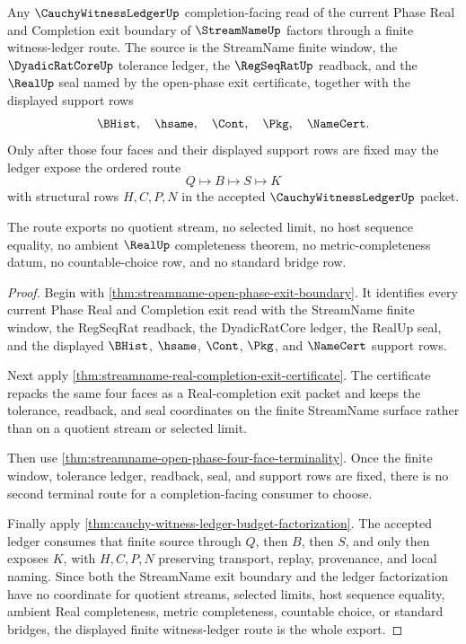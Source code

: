 \begin{theorem}
\label{thm:streamname-cauchy-witness-ledger-exit-route}
Any $\CauchyWitnessLedgerUp$ completion-facing read of the current Phase Real and Completion exit boundary of $\StreamNameUp$ factors through a finite witness-ledger route. The source is the StreamName finite window, the $\DyadicRatCoreUp$ tolerance ledger, the $\RegSeqRatUp$ readback, and the $\RealUp$ seal named by the open-phase exit certificate, together with the displayed support rows
$$
\BHist,\quad \hsame,\quad \Cont,\quad \Pkg,\quad \NameCert.
$$
Only after those four faces and their displayed support rows are fixed may the ledger expose the ordered route
$$
Q \longmapsto B \longmapsto S \longmapsto K
$$
with structural rows $H,C,P,N$ in the accepted $\CauchyWitnessLedgerUp$ packet.

The route exports no quotient stream, no selected limit, no host sequence equality, no ambient $\RealUp$ completeness theorem, no metric-completeness datum, no countable-choice row, and no standard bridge row.
\end{theorem}
\begin{proof}
Begin with \autoref{thm:streamname-open-phase-exit-boundary}. It identifies every current Phase Real and Completion exit read with the StreamName finite window, the RegSeqRat readback, the DyadicRatCore ledger, the RealUp seal, and the displayed $\BHist$, $\hsame$, $\Cont$, $\Pkg$, and $\NameCert$ support rows.

Next apply \autoref{thm:streamname-real-completion-exit-certificate}. The certificate repacks the same four faces as a Real-completion exit packet and keeps the tolerance, readback, and seal coordinates on the finite StreamName surface rather than on a quotient stream or selected limit.

Then use \autoref{thm:streamname-open-phase-four-face-terminality}. Once the finite window, tolerance ledger, readback, seal, and support rows are fixed, there is no second terminal route for a completion-facing consumer to choose.

Finally apply \autoref{thm:cauchy-witness-ledger-budget-factorization}. The accepted ledger consumes that finite source through $Q$, then $B$, then $S$, and only then exposes $K$, with $H,C,P,N$ preserving transport, replay, provenance, and local naming. Since both the StreamName exit boundary and the ledger factorization have no coordinate for quotient streams, selected limits, host sequence equality, ambient Real completeness, metric completeness, countable choice, or standard bridges, the displayed finite witness-ledger route is the whole export.
\end{proof}

